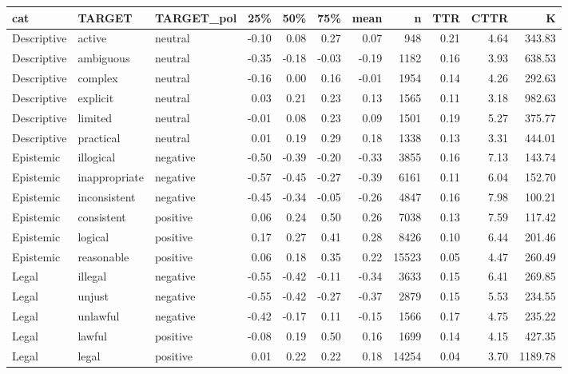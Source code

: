 \begin{table}[ht]
\centering
\begin{tabular}{lllrrrrrrrr}
  \hline
cat & TARGET & TARGET\_pol & 25\% & 50\% & 75\% & mean & n & TTR & CTTR & K \\ 
  \hline
Descriptive & active & neutral & -0.10 & 0.08 & 0.27 & 0.07 & 948 & 0.21 & 4.64 & 343.83 \\ 
  Descriptive & ambiguous & neutral & -0.35 & -0.18 & -0.03 & -0.19 & 1182 & 0.16 & 3.93 & 638.53 \\ 
  Descriptive & complex & neutral & -0.16 & 0.00 & 0.16 & -0.01 & 1954 & 0.14 & 4.26 & 292.63 \\ 
  Descriptive & explicit & neutral & 0.03 & 0.21 & 0.23 & 0.13 & 1565 & 0.11 & 3.18 & 982.63 \\ 
  Descriptive & limited & neutral & -0.01 & 0.08 & 0.23 & 0.09 & 1501 & 0.19 & 5.27 & 375.77 \\ 
  Descriptive & practical & neutral & 0.01 & 0.19 & 0.29 & 0.18 & 1338 & 0.13 & 3.31 & 444.01 \\ 
  Epistemic & illogical & negative & -0.50 & -0.39 & -0.20 & -0.33 & 3855 & 0.16 & 7.13 & 143.74 \\ 
  Epistemic & inappropriate & negative & -0.57 & -0.45 & -0.27 & -0.39 & 6161 & 0.11 & 6.04 & 152.70 \\ 
  Epistemic & inconsistent & negative & -0.45 & -0.34 & -0.05 & -0.26 & 4847 & 0.16 & 7.98 & 100.21 \\ 
  Epistemic & consistent & positive & 0.06 & 0.24 & 0.50 & 0.26 & 7038 & 0.13 & 7.59 & 117.42 \\ 
  Epistemic & logical & positive & 0.17 & 0.27 & 0.41 & 0.28 & 8426 & 0.10 & 6.44 & 201.46 \\ 
  Epistemic & reasonable & positive & 0.06 & 0.18 & 0.35 & 0.22 & 15523 & 0.05 & 4.47 & 260.49 \\ 
  Legal & illegal & negative & -0.55 & -0.42 & -0.11 & -0.34 & 3633 & 0.15 & 6.41 & 269.85 \\ 
  Legal & unjust & negative & -0.55 & -0.42 & -0.27 & -0.37 & 2879 & 0.15 & 5.53 & 234.55 \\ 
  Legal & unlawful & negative & -0.42 & -0.17 & 0.11 & -0.15 & 1566 & 0.17 & 4.75 & 235.22 \\ 
  Legal & lawful & positive & -0.08 & 0.19 & 0.50 & 0.16 & 1699 & 0.14 & 4.15 & 427.35 \\ 
  Legal & legal & positive & 0.01 & 0.22 & 0.22 & 0.18 & 14254 & 0.04 & 3.70 & 1189.78 \\ 

\end{tabular}
\end{table}
